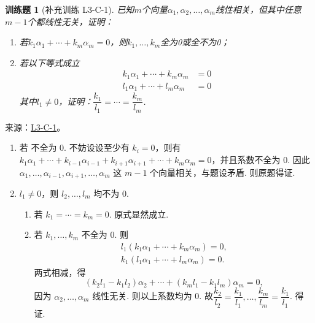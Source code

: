 \documentclass[UTF8,12pt,a4paper,fontset=fandol]{ctexart}
\newtheorem{exercise}{训练题}[section]
\begin{document}
\begin{exercise}[补充训练 L3-C-1]\label{prob:L3-C-1}
已知$m$个向量$\alpha_1,\alpha_2,\ldots,\alpha_m$线性相关，但其中任意$m-1$个都线性无关，证明：
        \begin{enumerate}
            \item 若$k_1\alpha_1+\cdots+k_m\alpha_m=0$，则$k_1,\ldots,k_m$全为0或全不为0；

            \item 若以下等式成立
                  \begin{align*}
                      k_1\alpha_1+\cdots+k_m\alpha_m & =0 \\
                      l_1\alpha_1+\cdots+l_m\alpha_m & =0
                  \end{align*}
                  其中$l_1\neq 0$，证明：$\dfrac{k_1}{l_1}=\cdots=\dfrac{k_m}{l_m}$.
        \end{enumerate}
\end{exercise}
\noindent 来源：\href{https://github.com/yhwu-is/Linear-Algebra-Left-Undone/blob/new/%E8%AE%B2%E4%B9%89/%E4%B8%93%E9%A2%98/3%20%E6%9C%89%E9%99%90%E7%BB%B4%E7%BA%BF%E6%80%A7%E7%A9%BA%E9%97%B4.tex}{L3-C-1}。
\begin{solve}
\begin{enumerate}
                \item 若 不全为 0. 不妨设设至少有 $k_i=0$，则有 $k_1\alpha_1+\cdots+k_{i-1}\alpha_{i-1}+k_{i+1}\alpha_{i+1}+\cdots+k_m\alpha_m=0$，并且系数不全为 0. 因此 $\alpha_1,\ldots,\alpha_{i-1},\alpha_{i+1},\ldots,\alpha_m$ 这 $m-1$ 个向量相关，与题设矛盾. 则原题得证.

                \item $l_1\neq 0$，则 $l_2,\ldots,l_m$ 均不为 0.
                      \begin{enumerate}
                          \item 若 $k_1=\cdots=k_m=0$. 原式显然成立.

                          \item 若 $k_1,\ldots,k_m$ 不全为 0. 则
                                \begin{gather*}
                                    l_1(k_1\alpha_1+\cdots+k_m\alpha_m)=0, \\
                                    k_1(l_1\alpha_1+\cdots+l_m\alpha_m)=0.
                                \end{gather*}
                                两式相减，得
                                \[(k_2l_1-k_1l_2)\alpha_2+\cdots+(k_ml_1-k_1l_m)\alpha_m=0,\]
                                因为 $\alpha_2,\ldots,\alpha_m$ 线性无关. 则以上系数均为 0. 故$\dfrac {k_2}{l_2}=\dfrac {k_1}{l_1},\ldots,\dfrac {k_m}{l_m}=\dfrac {k_1}{l_1}$. 得证.
                      \end{enumerate}
            \end{enumerate}
\end{solve}
\end{document}

